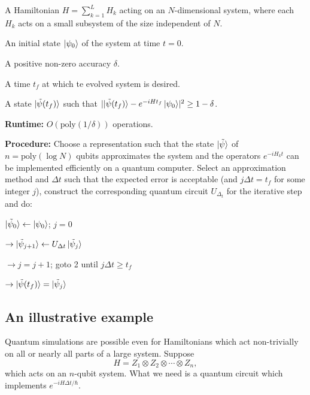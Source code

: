 \begin{algorithm}
    \caption{Quantum simulation}
    \begin{algorithmic}[1]
        \Require
        A Hamiltonian $H = \sum_{k=1}^L H_k$ acting on an $N$-dimensional system,
        where each $H_k$ acts on a small subsystem of the size independent of $N$.
        
        \Require 
        An initial state $\ket{\psi_0}$ of the system at time $t=0$.
        
        \Require
        A positive non-zero accuracy $\delta$.
        
        \Require
        A time $t_f$ at which te evolved system is desired.

        \Ensure
        A state $\ket{\tilde{\psi}(t_f)}$ such that $\lvert\ket{\tilde{\psi}(t_f)} - e^{-iHt_f}\ket{\psi_0}\rvert^2 \ge 1 - \delta$.

        \Statex
        \textbf{Runtime:} $O(\text{poly}(1/\delta))$ operations.

        \Statex
        \textbf{Procedure:} Choose a representation such that the state $\ket{\tilde{\psi}}$ of $n=\text{poly}(\log N)$ qubits approximates the system and the operators $e^{-iH_k t}$ can be implemented efficiently on a quantum computer.
        Select an approximation method and $\Delta t$ such that the expected error is acceptable (and $j\Delta t =t_f$ for some integer $j$),
        construct the corresponding quantum circuit $U_{\Delta_t}$ for the iterative step and do:

        \State 
        $\ket{\tilde{\psi}_0} \gets \ket{\psi_0}$; $j=0$ 

        \State 
        $\to \ket{\tilde{\psi}_{j+1}} \gets U_{\Delta t}\ket{\tilde{\psi}_j}$ 

        \State
        $\to j = j + 1$; goto 2 until $j\Delta t\ge t_f$ 

        \State
        $ \to \ket{\tilde{\psi}(t_f)} = \ket{\tilde{\psi}_j}$ 
    \end{algorithmic}
\end{algorithm}

\subsection{An illustrative example}
Quantum simulations are possible even for Hamiltonians which act non-trivially on all or nearly all parts of a large system.
Suppose
\[
    H = Z_1 \otimes Z_2 \otimes \cdots \otimes Z_n,
\]
which acts on an $n$-qubit system.
What we need is a quantum circuit which implements $e^{-iH\Delta t/\hbar}$.

